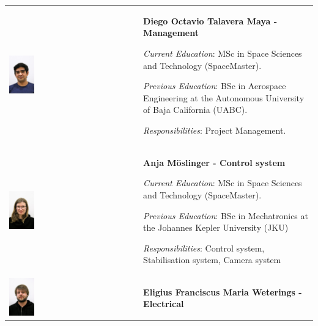 \begin{longtable}[]{m{} m{}}
	


\includegraphics[width=0.2\textwidth]{0-cover/img/TEAMPICS/Diego_final.jpg} & \textbf{Diego Octavio Talavera Maya - Management}

\smallskip
\textit{Current Education}: MSc in Space Sciences and Technology (SpaceMaster).

\smallskip
\textit{Previous Education}: BSc in Aerospace Engineering at the Autonomous University of Baja California (UABC).

\smallskip
\textit{Responsibilities}: Project Management.
\bigskip
\\

\includegraphics[width=0.2\textwidth]{0-cover/img/TEAMPICS/Anja_final.jpg}  & \textbf{Anja M\"oslinger - Control system}

\smallskip
\textit{Current Education}: MSc in Space Sciences and Technology (SpaceMaster).

\smallskip
\textit{Previous Education}: BSc in Mechatronics at the Johannes Kepler University (JKU)

\smallskip
\textit{Responsibilities}: Control system, Stabilisation system, Camera system
\bigskip
\\

\includegraphics[width=0.2\textwidth]{0-cover/img/TEAMPICS/Elrick_final.jpg}  & \textbf{Eligius Franciscus Maria Weterings - Electrical}


\end{longtable}
